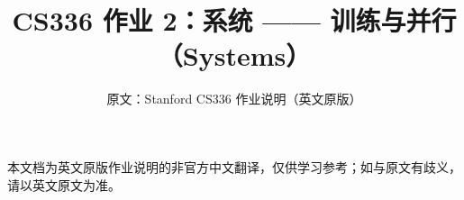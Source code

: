 \documentclass[11pt,a4paper]{ctexart}
\title{\textbf{CS336 作业 2：系统 —— 训练与并行（Systems）}}
\author{原文：Stanford CS336 作业说明（英文原版）}
\date{}
\begin{document}
\maketitle
\begin{center}\small
本文档为英文原版作业说明的非官方中文翻译，仅供学习参考；如与原文有歧义，请以英文原文为准。
\end{center}
\tableofcontents
\clearpage



\end{document}
